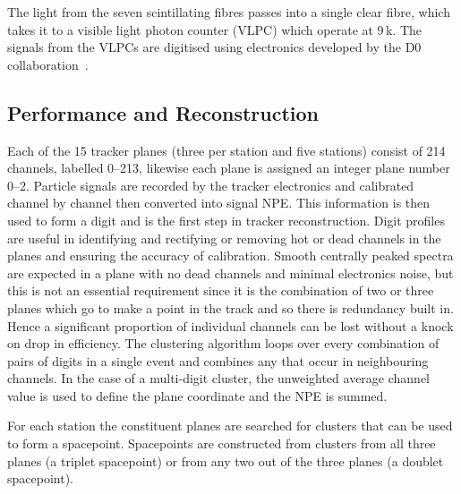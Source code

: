 The light from the seven scintillating fibres passes into a single clear fibre, which takes it to a visible light photon counter (VLPC) which operate at 9\,k. The signals from the VLPCs are digitised using electronics developed by the D0 collaboration~\cite{Abazov:2005pn}.


\subsection{Performance and Reconstruction}

Each of the 15 tracker planes (three per station and five stations) consist of 214 channels, labelled 0--213, likewise each plane is assigned an integer plane number 0--2. Particle signals are recorded by the tracker electronics and calibrated channel by channel then converted into signal NPE. This information is then used to form a digit and is the first step in tracker reconstruction.
Digit profiles are useful in identifying and rectifying or removing hot or dead channels in the planes and ensuring the accuracy of calibration.  Smooth centrally peaked spectra are expected in a plane with no dead channels and minimal electronics noise, but this is not an essential requirement since it is the combination of two or three planes which go to make a point in the track and so there is redundancy built in. Hence a significant proportion of individual channels can be lost without a knock on drop in efficiency. 
The clustering algorithm loops over every combination of pairs of digits in a single event and combines any that occur in neighbouring channels. In the case of a multi-digit cluster, the unweighted average channel value is used to define the plane coordinate and the NPE is summed.


For each station the constituent planes are searched for clusters that can be used to form a spacepoint.
Spacepoints are constructed from clusters from all three planes (a triplet spacepoint) or from any two out of the three planes (a doublet spacepoint).


